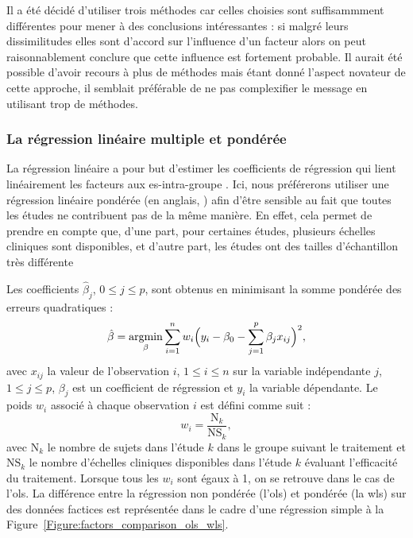 Il a été décidé d'utiliser trois méthodes car celles choisies sont suffisammment différentes pour mener à des conclusions intéressantes : si malgré leurs dissimilitudes 
elles sont d'accord sur l'influence d'un facteur alors on peut raisonnablement conclure que cette influence est fortement probable. Il aurait été possible
d'avoir recours à plus de méthodes mais étant donné l'aspect novateur de cette approche, il semblait préférable de ne pas complexifier le message en utilisant trop de méthodes.

\subsubsection{La régression linéaire multiple et pondérée} \label{wls_part}
La régression linéaire a pour but d'estimer les coefficients de régression qui lient linéairement les facteurs aux \gls{es}-intra-groupe \citep{Montgomery2012}. Ici, nous préférerons 
utiliser une régression linéaire pondérée (en anglais, ) afin d'être sensible au fait que toutes les études ne contribuent pas de la même manière. 
En effet, cela permet de prendre en compte que, d'une part, pour certaines études, plusieurs échelles cliniques sont disponibles, et d'autre part, les études ont des 
tailles d'échantillon très différente

Les coefficients $\hat{\beta}_{j}$, $0 \leq j \leq p$, sont obtenus en minimisant la somme pondérée des erreurs quadratiques :
\begin{equation}
\label{eq:factors_wls-minimization}
\hat{\beta} = \operatorname*{argmin}_\beta \sum_{i=1}^{n} w_{i} \Big(y_i - \beta_0 - \sum_{j=1}^{p}\beta_{j}x_{ij}\Big)^2,
\end{equation} 
avec $x_{ij}$ la valeur de l'observation $i$, $1 \leq i \leq n$ sur la variable indépendante $j$, $1 \leq j \leq p$,
$\beta_j$ est un coefficient de régression et $y_i$ la variable dépendante.
Le poids $w_{i}$ associé à chaque observation $i$ est défini comme suit : 
\begin{equation}
\label{eq:weight_WLS}
w_{i} = \frac{\text{N}_{k}}{\text{NS}_{k}},
\end{equation} 
avec $\text{N}_{k}$  le nombre de sujets dans l'étude $k$ dans le groupe suivant le traitement et $\text{NS}_{k}$  le nombre 
d'échelles cliniques disponibles dans l'étude $k$ évaluant l'efficacité du traitement. Lorsque tous les $w_{i}$ sont égaux à 1, on se retrouve dans le
cas de l'\gls{ols}. La différence entre la régression non pondérée (l'\gls{ols}) et pondérée (la \gls{wls}) sur des données factices est représentée dans le cadre
d'une régression simple à la Figure~\ref{Figure:factors_comparison_ols_wls}.

